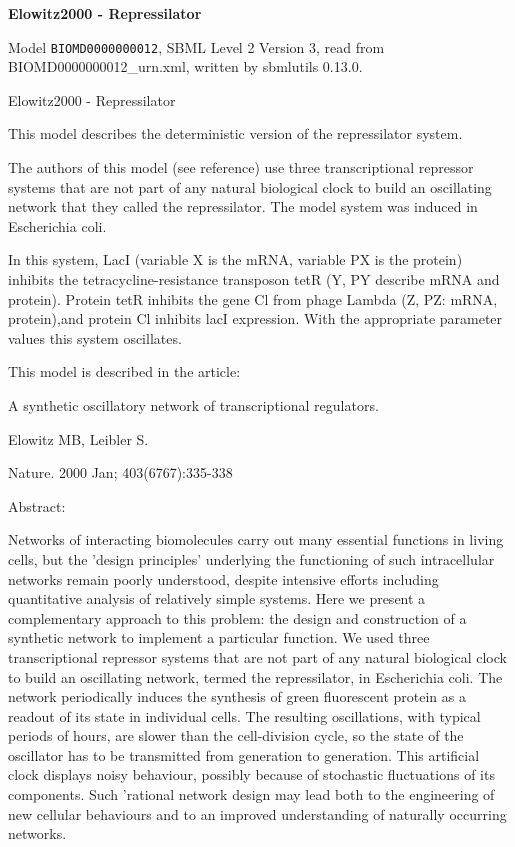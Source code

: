 \documentclass{article}
\begin{document}
{\centering\LARGE\bfseries Elowitz2000 - Repressilator\par}
\bigskip

Model \texttt{BIOMD0000000012}, SBML Level 2 Version 3, read from BIOMD0000000012\_\allowbreak{}urn.xml, written by sbmlutils 0.13.0.

Elowitz2000 - Repressilator

This model describes the deterministic version of the repressilator system.

The authors of this model (see reference) use three transcriptional repressor systems that are not part of any natural biological clock to build an oscillating network that they called the repressilator. The model system was induced in Escherichia coli.

In this system, LacI (variable X is the mRNA, variable PX is the protein) inhibits the tetracycline-resistance transposon tetR (Y, PY describe mRNA and protein). Protein tetR inhibits the gene Cl from phage Lambda (Z, PZ: mRNA, protein),and protein Cl inhibits lacI expression. With the appropriate parameter values this system oscillates.

This model is described in the article:

A synthetic oscillatory network of transcriptional regulators.

Elowitz MB, Leibler S.

Nature. 2000 Jan; 403(6767):335-338

Abstract:

Networks of interacting biomolecules carry out many essential functions in living cells, but the 'design principles' underlying the functioning of such intracellular networks remain poorly understood, despite intensive efforts including quantitative analysis of relatively simple systems. Here we present a complementary approach to this problem: the design and construction of a synthetic network to implement a particular function. We used three transcriptional repressor systems that are not part of any natural biological clock to build an oscillating network, termed the repressilator, in Escherichia coli. The network periodically induces the synthesis of green fluorescent protein as a readout of its state in individual cells. The resulting oscillations, with typical periods of hours, are slower than the cell-division cycle, so the state of the oscillator has to be transmitted from generation to generation. This artificial clock displays noisy behaviour, possibly because of stochastic fluctuations of its components. Such 'rational network design may lead both to the engineering of new cellular behaviours and to an improved understanding of naturally occurring networks.
\end{document}
